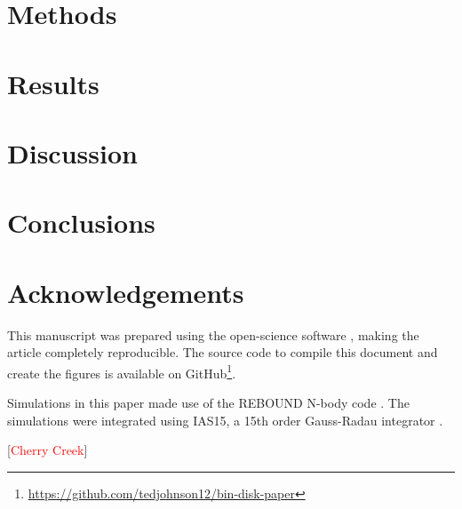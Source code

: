 \documentclass[twocolumn]{aastex631}
\newcommand\ghurl[0]{\url{https://github.com/tedjohnson12/bin-disk-paper}}
\begin{document}
\section{Methods}
\label{sec:methods}

\section{Results}
\label{sec:results}

\section{Discussion}
\label{sec:discussion}

\section{Conclusions}
\label{sec:conclusions}





\section{Acknowledgements}
\label{sec:ack}

This manuscript was prepared using the open-science software \href{https://show-your.work/en/latest/intro/}{\showyourwork} \citep{luger2021}, making the article completely
reproducible. The source code to compile this document and create the figures is available on GitHub\footnote{\ghurl}.

Simulations in this paper made use of the REBOUND N-body code \citep{rebound}.
The simulations were integrated using IAS15, a 15th order Gauss-Radau integrator \citep{reboundias15}. 

[\textcolor{red}{Cherry Creek}]


\end{document}
